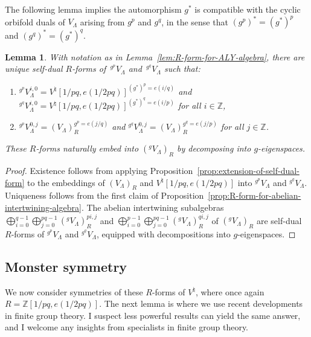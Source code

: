 \documentclass[11pt]{article}
\newcommand{\bZ}{\mathbb{Z}}
\newtheorem{lem}[thm]{Lemma}
\theoremstyle{definition}
\begin{document}
The following lemma implies the automorphism $g^*$ is compatible with the cyclic orbifold duals of $V_\Lambda$ arising from $g^p$ and $g^q$, in the sense that $(g^p)^* = (g^*)^p$ and $(g^q)^* = (g^*)^q$.

\begin{lem} \label{lem:R-forms-for-prime-order-orbifold}
With notation as in Lemma~{\rm \ref{lem:R-form-for-ALY-algebra}}, there are unique self-dual $R$-forms of~${}^{g^p}V_\Lambda$ and~${}^{g^q}V_\Lambda$ such that:
\begin{enumerate}\itemsep=0pt
\item[$1)$] ${}^{g^p}V_\Lambda^{i,0} = V^\natural[1/pq,e(1/2pq)]^{(g^*)^p = e(i/q)}$ and ${}^{g^q}V_\Lambda^{i,0} = V^\natural[1/pq,e(1/2pq)]^{(g^*)^q = e(i/p)}$ for all $i \in \bZ$,
\item[$2)$] ${}^{g^p}V_\Lambda^{0,j} = (V_\Lambda)_R^{g^p = e(j/q)}$ and ${}^{g^q}V_\Lambda^{0,j} = (V_\Lambda)_R^{g^q = e(j/p)}$ for all $j \in \bZ$.
\end{enumerate}
These $R$-forms naturally embed into $({}^g V_\Lambda)_R$ by decomposing into $g$-eigenspaces.
\end{lem}
\begin{proof}Existence follows from applying Proposition~\ref{prop:extension-of-self-dual-form} to the embeddings of $(V_\Lambda)_R$ and $V^\natural[1/pq,e(1/2pq)]$ into ${}^{g^p}V_\Lambda$ and ${}^{g^q}V_\Lambda$. Uniqueness follows from the first claim of Proposition~\ref{prop:R-form-for-abelian-intertwining-algebra}. The abelian intertwining subalgebras $\bigoplus_{i=0}^{q-1} \bigoplus_{j=0}^{pq-1} ({}^gV_\Lambda)_R^{pi,j}$ and $\bigoplus_{i=0}^{p-1} \bigoplus_{j=0}^{pq-1} ({}^gV_\Lambda)_R^{qi,j}$ of $({}^g V_\Lambda)_R$ are self-dual $R$-forms of ${}^{g^p}V_\Lambda$ and ${}^{g^q}V_\Lambda$, equipped with decompositions into $g$-eigen\-spa\-ces.
\end{proof}

\subsection{Monster symmetry}

We now consider symmetries of these $R$-forms of $V^\natural$, where once again $R = \bZ[1/pq, e(1/2pq)]$. The next lemma is where we use recent developments in finite group theory. I suspect less powerful results can yield the same answer, and I welcome any insights from specialists in finite group theory.
\end{document}
